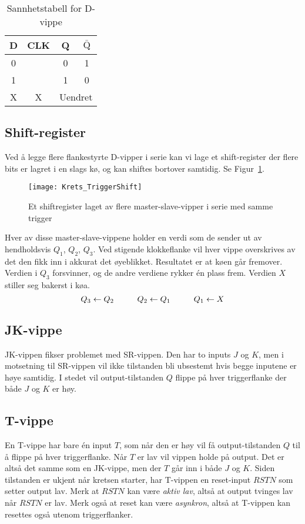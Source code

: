 \documentclass[12pt,a4paper,norsk]{article}
\newcommand{\rising}{\texttiming{[-,timing/slope=0]LH}}
\begin{document}
\begin{table}[hbt!]
  \centering
  \begin{tabular}{cc|cc}
    \toprule
    D & CLK & Q & $\bar{\text{Q}}$ \\
    \midrule
    0 & \rising{} & 0 & 1\\
    1 & \rising{} & 1 & 0\\
    X & X & \multicolumn{2}{c}{Uendret}\\
    \bottomrule
  \end{tabular}
  \caption{Sannhetstabell for D-vippe}
\end{table}

\subsection{Shift-register}
Ved å legge flere flankestyrte D-vipper i serie kan vi lage et shift-register der
flere bits er lagret i en slags kø, og kan shiftes bortover samtidig. Se Figur~\ref{fig:trigger_shift}.

\begin{figure}[hbt!]
  \centering
  \texttt{[image: Krets\_TriggerShift]}
  \caption{Et shiftregister laget av flere master-slave-vipper i serie med samme trigger\label{fig:trigger_shift}}
\end{figure}

Hver av disse master-slave-vippene holder en verdi som de sender ut av hendholdsvis $Q_{1}$,
$Q_{2}$, $Q_{3}$. Ved stigende klokkeflanke vil hver vippe overskrives av det
den fikk inn i akkurat det øyeblikket. Resultatet er at køen går fremover.
Verdien i $Q_{3}$ forsvinner, og de andre verdiene rykker én plass frem. Verdien
$X$ stiller seg bakerst i køa.
\[
  Q_{3} \leftarrow Q_{2} \hspace{10mm} Q_{2} \leftarrow Q_{1} \hspace{10mm}  Q_{1} \leftarrow X
\]

\subsection{JK-vippe}
JK-vippen fikser problemet med SR-vippen. Den har to inputs $J$ og $K$, men i
motsetning til SR-vippen vil ikke tilstanden bli ubsestemt hvis begge inputene
er høye samtidig. I stedet vil output-tilstanden $Q$ flippe på hver triggerflanke
der både $J$ og $K$ er høy.

\subsection{T-vippe}
En T-vippe har bare én input $T$, som når den er høy vil få output-tilstanden
$Q$ til å flippe på hver triggerflanke. Når $T$ er lav vil vippen holde på
output. Det er altså det samme som en JK-vippe, men der $T$ går inn i både $J$
og $K$. Siden tilstanden er ukjent når kretsen starter, har T-vippen en
reset-input $RSTN$ som setter output lav. Merk at $RSTN$ kan være \textit{aktiv
 lav}, altså at output tvinges lav når $RSTN$ er lav. Merk også at reset kan
være \textit{asynkron}, altså at T-vippen kan resettes også utenom
triggerflanker.
\end{document}
